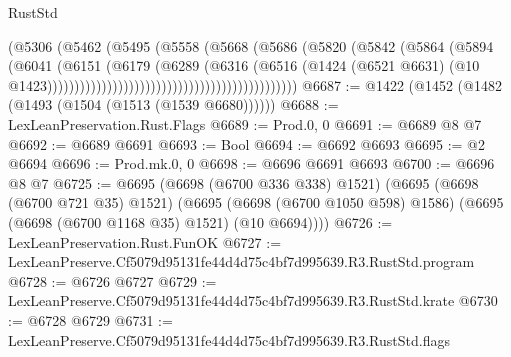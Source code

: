 \begin{lexlean}{RustStd}
\begin{coremodule}
                                                            (@5306
                                                              (@5462
                                                                (@5495
                                                                  (@5558
                                                                    (@5668
                                                                      (@5686
                                                                        (@5820
                                                                          (@5842
                                                                            (@5864
                                                                              (@5894
                                                                                (@6041
                                                                                  (@6151
                                                                                    (@6179
                                                                                      (@6289
                                                                                        (@6316
                                                                                          (@6516
                                                                                            (@1424
                                                                                              (@6521
                                                                                                @6631)
                                                                                              (@10
                                                                                                @1423))))))))))))))))))))))))))))))))))))))))))))))
@6687 := @1422 (@1452 (@1482 (@1493 (@1504 (@1513 (@1539 @6680))))))
@6688 := LexLeanPreservation.Rust.Flags
@6689 := Prod.{0, 0}
@6691 := @6689 @8 @7
@6692 := @6689 @6691
@6693 := Bool
@6694 := @6692 @6693
@6695 := @2 @6694
@6696 := Prod.mk.{0, 0}
@6698 := @6696 @6691 @6693
@6700 := @6696 @8 @7
@6725 := @6695
    (@6698 (@6700 @336 @338) @1521)
    (@6695
      (@6698 (@6700 @721 @35) @1521)
      (@6695 (@6698 (@6700 @1050 @598) @1586) (@6695 (@6698 (@6700 @1168 @35) @1521) (@10 @6694))))
@6726 := LexLeanPreservation.Rust.FunOK
@6727 := LexLeanPreserve.Cf5079d95131fe44d4d75c4bf7d995639.R3.RustStd.program
@6728 := @6726 @6727
@6729 := LexLeanPreserve.Cf5079d95131fe44d4d75c4bf7d995639.R3.RustStd.krate
@6730 := @6728 @6729
@6731 := LexLeanPreserve.Cf5079d95131fe44d4d75c4bf7d995639.R3.RustStd.flags

\end{coremodule}
\end{lexlean}
